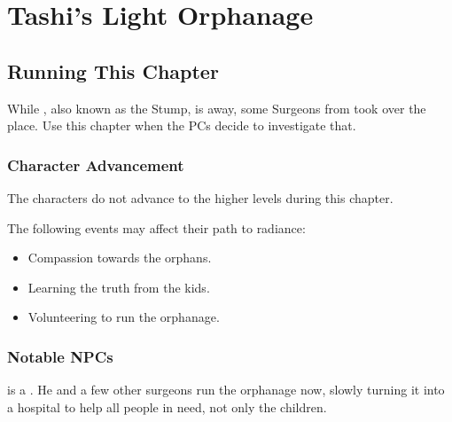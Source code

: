 \chapter{Tashi's Light Orphanage}
\label{chap:chapterOrphanage}

\setcounter{section}{-1}
\section{Running This Chapter}

While \npcArshqqam{}, also known as the Stump, is away, some Surgeons from \locationKharbranth{} took over the place. Use this chapter when the PCs decide to investigate that.


\subsection{Character Advancement}

The characters do not advance to the higher levels during this chapter.

The following events may affect their path to radiance:
\begin{itemize}
	\item Compassion towards the orphans.
	\item Learning the truth from the kids.
	\item Volunteering to run the orphanage.
\end{itemize}


\subsection{Notable NPCs}

\npcDoctor[s]{} is a \enemyDiagramSurgeonB{}. He and a few other surgeons run the orphanage now, slowly turning it into a hospital to help all people in need, not only the children.


\newpage

\newpage






